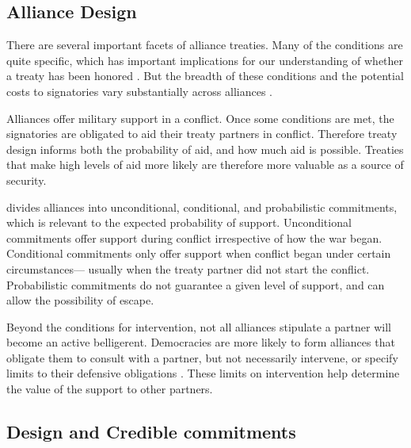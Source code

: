 \documentclass[12pt]{article}
\begin{document}
\subsection*{Alliance Design}

There are several important facets of alliance treaties. Many of the conditions are quite specific, which has important implications for our understanding of whether a treaty has been honored \citep{Leedsetal2000}. But the breadth of these conditions and the potential costs to signatories vary substantially across alliances \citep{BensonClinton2016}. 

Alliances offer military support in a conflict. Once some conditions are met, the signatories are obligated to aid their treaty partners in conflict. Therefore treaty design informs both the probability of aid, and how much aid is possible. Treaties that make high levels of aid more likely are therefore more valuable as a source of security. 

\citet{Benson2011, Benson2012} divides alliances into unconditional, conditional, and probabilistic commitments, which is relevant to the expected probability of support. Unconditional commitments offer support during conflict irrespective of how the war began. Conditional commitments only offer support when conflict began under certain circumstances--- usually when the treaty partner did not start the conflict. Probabilistic commitments do not guarantee a given level of support, and can allow the possibility of escape. 

Beyond the conditions for intervention, not all alliances stipulate a partner will become an active belligerent. Democracies are more likely to form alliances that obligate them to consult with a partner, but not necessarily intervene, or specify limits to their defensive obligations \citep{Chibaetal2015}. These limits on intervention help determine the value of the support to other partners. 


\subsection*{Design and Credible commitments}












  
% 
\end{document}
